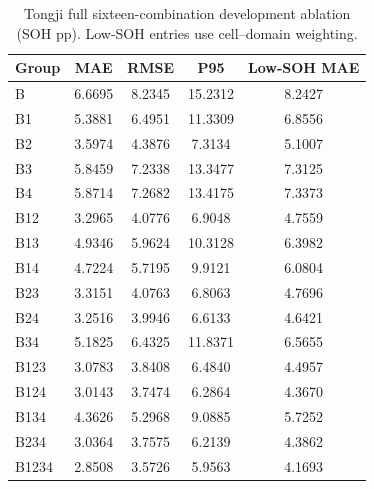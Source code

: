 \begin{table}[!htbp]
\centering
\caption{Tongji full sixteen-combination development ablation (SOH pp). Low-SOH entries use cell--domain weighting.}
\label{tab:allablTongji}
\footnotesize
\setlength{\tabcolsep}{4pt}
\begin{tabular}{lcccc}
\toprule
Group & MAE & RMSE & P95 & Low-SOH MAE \\
\midrule
B & 6.6695 & 8.2345 & 15.2312 & 8.2427 \\
B1 & 5.3881 & 6.4951 & 11.3309 & 6.8556 \\
B2 & 3.5974 & 4.3876 & 7.3134 & 5.1007 \\
B3 & 5.8459 & 7.2338 & 13.3477 & 7.3125 \\
B4 & 5.8714 & 7.2682 & 13.4175 & 7.3373 \\
B12 & 3.2965 & 4.0776 & 6.9048 & 4.7559 \\
B13 & 4.9346 & 5.9624 & 10.3128 & 6.3982 \\
B14 & 4.7224 & 5.7195 & 9.9121 & 6.0804 \\
B23 & 3.3151 & 4.0763 & 6.8063 & 4.7696 \\
B24 & 3.2516 & 3.9946 & 6.6133 & 4.6421 \\
B34 & 5.1825 & 6.4325 & 11.8371 & 6.5655 \\
B123 & 3.0783 & 3.8408 & 6.4840 & 4.4957 \\
B124 & 3.0143 & 3.7474 & 6.2864 & 4.3670 \\
B134 & 4.3626 & 5.2968 & 9.0885 & 5.7252 \\
B234 & 3.0364 & 3.7575 & 6.2139 & 4.3862 \\
B1234 & 2.8508 & 3.5726 & 5.9563 & 4.1693 \\
\bottomrule
\end{tabular}
\end{table}
